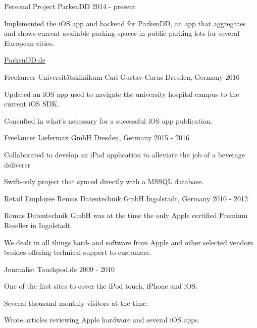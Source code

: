 \begin{cventries}
\cventry
	{Personal Project}
	{ParkenDD}
	{}
	{2014 - present}
	{
		\begin{cvitems}
			\item {Implemented the iOS app and backend for ParkenDD, an app that aggregates and shows current available parking spaces in public parking lots for several European cities.}
			\item {\href{https://parkendd.de}{ParkenDD.de}}
		\end{cvitems}
	}
	
\cventry
	{Freelancer}
	{Universitätsklinikum Carl Gustav Carus}
	{Dresden, Germany}
	{2016}
	{
		\begin{cvitems}
			\item {Updated an iOS app used to navigate the university hospital campus to the current iOS SDK.}
			\item {Consulted in what's necessary for a successful iOS app publication.}
		\end{cvitems}
	}
	
\cventry
	{Freelancer}
	{Liefermax GmbH}
	{Dresden, Germany}
	{2015 - 2016}
	{
		\begin{cvitems}
			\item {Collaborated to develop an iPad application to alleviate the job of a beverage deliverer}
			\item {Swift-only project that synced directly with a MSSQL database.}
		\end{cvitems}
	}

	
\cventry
	{Retail Employee}
	{Remus Datentechnik GmbH}
	{Ingolstadt, Germany}
	{2010 - 2012}
	{
		\begin{cvitems}
			\item {Remus Datentechnik GmbH was at the time the only Apple certified Premium Reseller in Ingolstadt.}
			\item {We dealt in all things hard- and software from Apple and other selected vendors besides offering technical support to customers.}
		\end{cvitems}
	}
	
\cventry
	{Journalist}
	{Touchpod.de}
	{}
	{2009 - 2010}
	{
		\begin{cvitems}
			\item {One of the first sites to cover the iPod touch, iPhone and iOS.}
			\item {Several thousand monthly visitors at the time.}
			\item {Wrote articles reviewing Apple hardware and several iOS apps.}
		\end{cvitems}
	}

\end{cventries}

